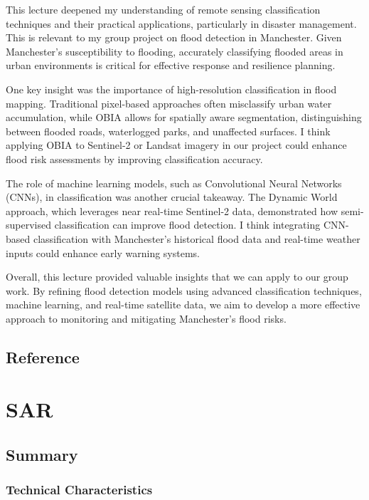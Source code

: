 \documentclass[
  letterpaper,
]{scrbook}
\begin{document}
This lecture deepened my understanding of remote sensing classification
techniques and their practical applications, particularly in disaster
management. This is relevant to my group project on flood detection in
Manchester. Given Manchester's susceptibility to flooding, accurately
classifying flooded areas in urban environments is critical for
effective response and resilience planning.

One key insight was the importance of high-resolution classification in
flood mapping. Traditional pixel-based approaches often misclassify
urban water accumulation, while OBIA allows for spatially aware
segmentation, distinguishing between flooded roads, waterlogged parks,
and unaffected surfaces. I think applying OBIA to Sentinel-2 or Landsat
imagery in our project could enhance flood risk assessments by improving
classification accuracy.

The role of machine learning models, such as Convolutional Neural
Networks (CNNs), in classification was another crucial takeaway. The
Dynamic World approach, which leverages near real-time Sentinel-2 data,
demonstrated how semi-supervised classification can improve flood
detection. I think integrating CNN-based classification with
Manchester's historical flood data and real-time weather inputs could
enhance early warning systems.

Overall, this lecture provided valuable insights that we can apply to
our group work. By refining flood detection models using advanced
classification techniques, machine learning, and real-time satellite
data, we aim to develop a more effective approach to monitoring and
mitigating Manchester's flood risks.

\section{Reference}\label{reference-5}


\chapter{SAR}\label{sar}

\section{Summary}\label{summary-5}

\subsection{Technical Characteristics}\label{technical-characteristics}
\end{document}
